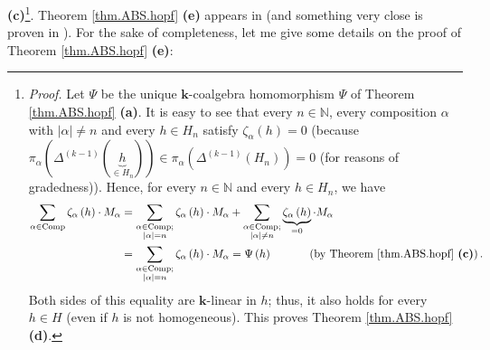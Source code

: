\documentclass
[numbers=enddot,12pt,final,onecolumn,notitlepage,abstracton]{scrartcl}%
\theoremstyle{definition}
\let\sumnonlimits\sum
\renewcommand{\sum}{\sumnonlimits\limits}
\begin{document}
\textbf{(c)}\footnote{\textit{Proof.} Let $\Psi$ be the unique $\mathbf{k}%
$-coalgebra homomorphism $\Psi$ of Theorem \ref{thm.ABS.hopf} \textbf{(a)}. It
is easy to see that every $n\in\mathbb{N}$, every composition $\alpha$ with
$\left\vert \alpha\right\vert \neq n$ and every $h\in H_{n}$ satisfy
$\zeta_{\alpha}\left(  h\right)  =0$ (because $\pi_{\alpha}\left(
\Delta^{\left(  k-1\right)  }\left(  \underbrace{h}_{\in H_{n}}\right)
\right)  \in\pi_{\alpha}\left(  \Delta^{\left(  k-1\right)  }\left(
H_{n}\right)  \right)  =0$ (for reasons of gradedness)). Hence, for every
$n\in\mathbb{N}$ and every $h\in H_{n}$, we have%
\begin{align*}
\sum_{\alpha\in\operatorname*{Comp}}\zeta_{\alpha}\left(  h\right)  \cdot
M_{\alpha}  &  =\sum_{\substack{\alpha\in\operatorname*{Comp};\\\left\vert
\alpha\right\vert =n}}\zeta_{\alpha}\left(  h\right)  \cdot M_{\alpha}%
+\sum_{\substack{\alpha\in\operatorname*{Comp};\\\left\vert \alpha\right\vert
\neq n}}\underbrace{\zeta_{\alpha}\left(  h\right)  }_{=0}\cdot M_{\alpha}\\
&  =\sum_{\substack{\alpha\in\operatorname*{Comp};\\\left\vert \alpha
\right\vert =n}}\zeta_{\alpha}\left(  h\right)  \cdot M_{\alpha}=\Psi\left(
h\right)  \ \ \ \ \ \ \ \ \ \ \left(  \text{by Theorem \ref{thm.ABS.hopf}
\textbf{(c)}}\right)  .
\end{align*}
Both sides of this equality are $\mathbf{k}$-linear in $h$; thus, it also
holds for every $h\in H$ (even if $h$ is not homogeneous). This proves Theorem
\ref{thm.ABS.hopf} \textbf{(d)}.}. Theorem \ref{thm.ABS.hopf} \textbf{(e)}
appears in \cite[Remark 7.1.4]{Reiner} (and something very close is proven in
\cite[Theorem 4.3]{ABS}). For the sake of completeness, let me give some
details on the proof of Theorem \ref{thm.ABS.hopf} \textbf{(e)}:
\end{document}
